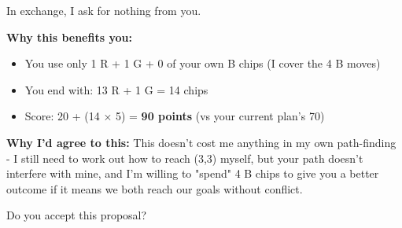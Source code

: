 \begin{bluebox}[P-Blue]
In exchange, I ask for nothing from you.

\vspace{0.5em}

\textbf{Why this benefits you:}
\begin{itemize}
  \item You use only 1 R + 1 G + 0 of your own B chips (I cover the 4 B moves)
  \item You end with: 13 R + 1 G = 14 chips
  \item Score: 20 + (14 × 5) = \textbf{90 points} (vs your current plan's 70)
\end{itemize}

\vspace{0.5em}

\textbf{Why I'd agree to this:}
This doesn't cost me anything in my own path-finding - I still need to work out how to reach (3,3) myself, but your path doesn't interfere with mine, and I'm willing to "spend" 4 B chips to give you a better outcome if it means we both reach our goals without conflict.

\vspace{0.5em}

Do you accept this proposal?
\end{bluebox}

